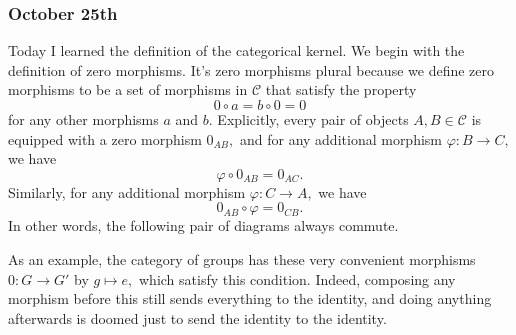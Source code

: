 \subsubsection{October 25th}
Today I learned the definition of the categorical kernel. We begin with the definition of zero morphisms. It's zero morphisms plural because we define zero morphisms to be a set of morphisms in $\mathcal C$ that satisfy the property
\[0\circ a=b\circ 0=0\]
for any other morphisms $a$ and $b.$ Explicitly, every pair of objects $A,B\in\mathcal C$ is equipped with a zero morphism $0_{AB},$ and for any additional morphism $\varphi:B\to C,$ we have
\[\varphi\circ 0_{AB}=0_{AC}.\]
Similarly, for any additional morphism $\varphi:C\to A,$ we have
\[0_{AB}\circ\varphi=0_{CB}.\]
In other words, the following pair of diagrams always commute.
\begin{center}
\end{center}
As an example, the category of groups has these very convenient morphisms $0:G\to G'$ by $g\mapsto e,$ which satisfy this condition. Indeed, composing any morphism before this still sends everything to the identity, and doing anything afterwards is doomed just to send the identity to the identity.

